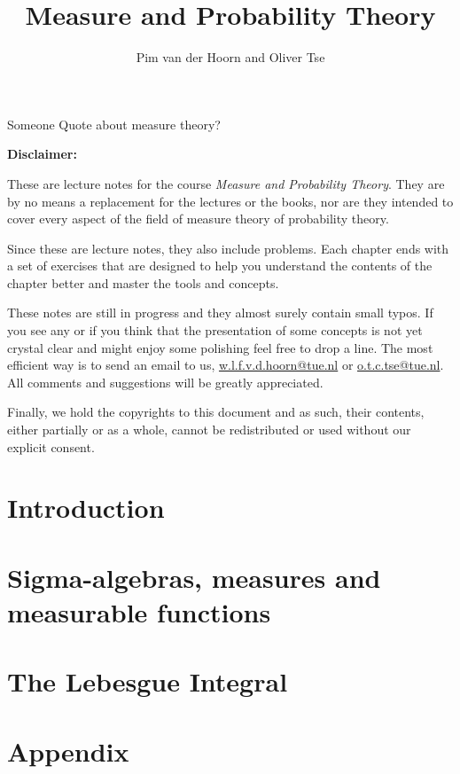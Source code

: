 \documentclass[draft]{lecturenotes}
\begin{document}
\begin{titlepage}
    \title{Measure and Probability Theory}
    \author{Pim van der Hoorn and Oliver Tse}
    \maketitle
\end{titlepage}

\begin{chapquote}[30pt]{Someone}
Quote about measure theory?
\end{chapquote}
\vfill
\textbf{Disclaimer:}

\vspace{0.5cm} 
These are lecture notes for the course \emph{Measure and Probability Theory}. They are by no means a replacement for the lectures or the books, nor are they intended to cover every aspect of the field of measure theory of probability theory.

Since these are lecture notes, they also include problems. Each chapter ends with a set of exercises that are designed to help you understand the contents of the chapter better and master the tools and concepts. 

These notes are still in progress and they almost surely contain small typos. If you see any or if you think that the presentation of some concepts is not yet crystal clear and might enjoy some polishing feel free to drop a line. The most efficient way is to send an email to us, \href{mailto:w.l.f.v.d.hoorn@tue.nl}{w.l.f.v.d.hoorn@tue.nl} or \href{mailto:o.t.c.tse@tue.nl}{o.t.c.tse@tue.nl}. All comments and suggestions will be greatly appreciated.

Finally, we hold the copyrights to this document and as such, their contents, either partially or as a whole, cannot be redistributed or used without our explicit consent.

\newpage

\tableofcontents

\chapter{Introduction}
\label{chapter:introduction}

\chapter{Sigma-algebras, measures and measurable functions}
\label{chapter:sigma_algebras}


\chapter{The Lebesgue Integral}
\label{chapter:integration}


\appendix
\chapter{Appendix}
\label{chapter:appendix}



\end{document}
